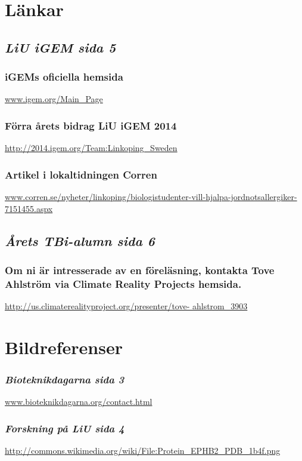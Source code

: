 

\section*{\textbf{Länkar}}


\subsection*{\emph{LiU iGEM sida 5}}

\subsubsection*{iGEMs oficiella hemsida}
\url{www.igem.org/Main_Page}

\subsubsection*{Förra årets bidrag LiU iGEM 2014}
\url{http://2014.igem.org/Team:Linkoping_Sweden}

\subsubsection*{Artikel i lokaltidningen Corren}
\url{www.corren.se/nyheter/linkoping/biologistudenter-vill-hjalpa-jordnotsallergiker-7151455.aspx}

\subsection*{\emph{Årets TBi-alumn sida 6}}
\subsubsection*{Om ni är intresserade av en föreläsning, kontakta Tove Ahlström via Climate Reality Projects hemsida.} 
\url{http://us.climaterealityproject.org/presenter/tove-
ahlstrom_3903}
\\


\section*{Bildreferenser}

\subsubsection*{\emph{Bioteknikdagarna sida 3}}
\url{www.bioteknikdagarna.org/contact.html}


\subsubsection*{\emph{Forskning på LiU sida 4}}
\url{http://commons.wikimedia.org/wiki/File:Protein_EPHB2_PDB_1b4f.png}


